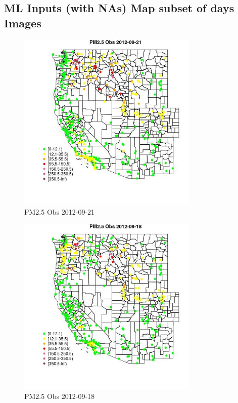 
\subsection{ML Inputs (with NAs) Map subset of days Images} 
 

\begin{figure} 
\centering  
\includegraphics[width=0.77\textwidth]{Code_Outputs/Report_ML_input_PM25_Step4_part_e_de_duplicated_aves_compiled_2019-05-14wNAs_MapObsPM25_Obs2012-09-21.jpg} 
\caption{\label{fig:Report_ML_input_PM25_Step4_part_e_de_duplicated_aves_compiled_2019-05-14wNAsMapObsPM25_Obs2012-09-21}PM2.5 Obs 2012-09-21} 
\end{figure} 
 

\begin{figure} 
\centering  
\includegraphics[width=0.77\textwidth]{Code_Outputs/Report_ML_input_PM25_Step4_part_e_de_duplicated_aves_compiled_2019-05-14wNAs_MapObsPM25_Obs2012-09-18.jpg} 
\caption{\label{fig:Report_ML_input_PM25_Step4_part_e_de_duplicated_aves_compiled_2019-05-14wNAsMapObsPM25_Obs2012-09-18}PM2.5 Obs 2012-09-18} 
\end{figure} 
 

